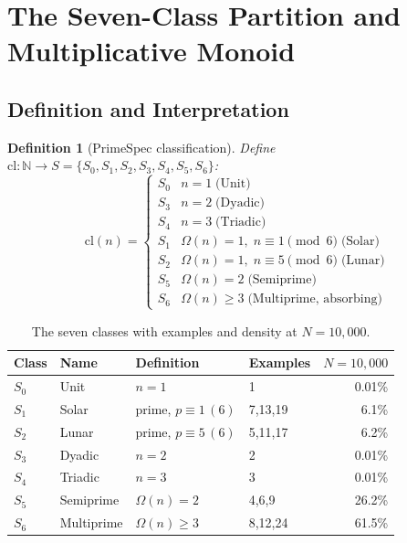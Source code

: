 \documentclass[10pt,twocolumn]{article}
\newtheorem{definition}[theorem]{Definition}
\newcommand{\cl}{\mathrm{cl}}
\newcommand{\Om}{\Omega}
\newcommand{\N}{\mathbb{N}}
\begin{document}
\section{The Seven-Class Partition and Multiplicative Monoid}

\subsection{Definition and Interpretation}

\begin{definition}[PrimeSpec classification]\label{def:primespec}
Define $\cl : \N \to S = \{S_0, S_1, S_2, S_3, S_4, S_5, S_6\}$:
\[
\cl(n) = \begin{cases}
S_0 & n = 1 \;\text{(Unit)} \\
S_3 & n = 2 \;\text{(Dyadic)} \\
S_4 & n = 3 \;\text{(Triadic)} \\
S_1 & \Om(n)=1,\; n \equiv 1\!\pmod{6} \;\text{(Solar)} \\
S_2 & \Om(n)=1,\; n \equiv 5\!\pmod{6} \;\text{(Lunar)} \\
S_5 & \Om(n) = 2 \;\text{(Semiprime)} \\
S_6 & \Om(n) \geq 3 \;\text{(Multiprime, absorbing)}
\end{cases}
\]
\end{definition}

\begin{table}[htbp]
\centering
\caption{The seven classes with examples and density at $N=10{,}000$.}\label{tab:classes}
\small
\setlength{\tabcolsep}{4pt}
\begin{tabular}{@{}llllr@{}}
\toprule
Class & Name & Definition & Examples & $N{=}10{,}000$ \\
\midrule
$S_0$ & Unit      & $n=1$               & 1       & 0.01\% \\
$S_1$ & Solar     & prime, $p\!\equiv\!1\,(6)$ & 7,13,19 & 6.1\% \\
$S_2$ & Lunar     & prime, $p\!\equiv\!5\,(6)$ & 5,11,17 & 6.2\% \\
$S_3$ & Dyadic    & $n=2$               & 2       & 0.01\% \\
$S_4$ & Triadic   & $n=3$               & 3       & 0.01\% \\
$S_5$ & Semiprime & $\Om(n)=2$          & 4,6,9   & 26.2\% \\
$S_6$ & Multiprime& $\Om(n)\geq 3$      & 8,12,24 & 61.5\% \\
\bottomrule
\end{tabular}
\end{table}
\end{document}
